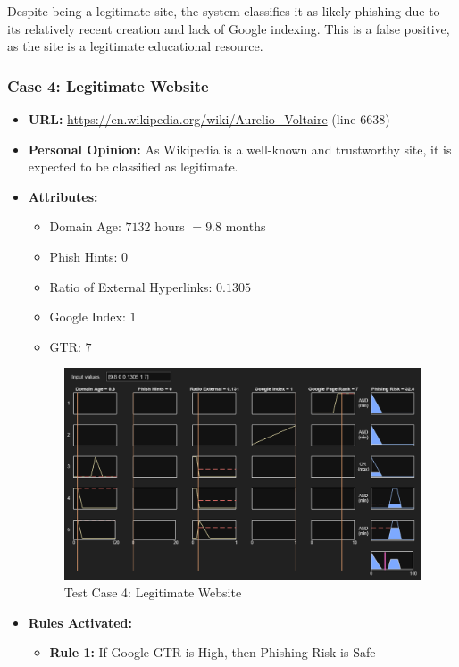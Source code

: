 \documentclass[11pt]{article}
\begin{document}
Despite being a legitimate site, the system classifies it as likely phishing due to its relatively recent creation and lack of Google indexing. This is a false positive, as the site is a legitimate educational resource. 

\subsubsection{Case 4: Legitimate Website}

\begin{itemize}
    \item \textbf{URL:} \url{https://en.wikipedia.org/wiki/Aurelio_Voltaire} (line 6638)
    \item \textbf{Personal Opinion:} As Wikipedia is a well-known and trustworthy site, it is expected to be classified as legitimate.
    \item \textbf{Attributes:}
    \begin{itemize}
        \item Domain Age: $7132$ hours $= 9.8$ months
        \item Phish Hints: $0$
        \item Ratio of External Hyperlinks: $0.1305$
        \item Google Index: $1$
        \item GTR: $7$
    \end{itemize}
    \begin{figure}[h!]
        \centering
        \includegraphics[width=\textwidth]{test-4.png}
        \caption{Test Case 4: Legitimate Website}
    \end{figure}
    \item \textbf{Rules Activated:} 
    \begin{itemize}
        \item \textbf{Rule 1:} If Google GTR is High, then Phishing Risk is Safe

\end{itemize}
\end{itemize}
\end{document}
